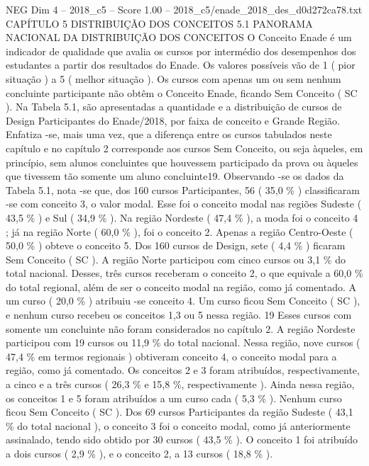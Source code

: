 \begin{textsample}{NEG Dim 4 – 2018\_c5 – Score 1.00 – 2018\_c5/enade\_2018\_des\_d0d272ca78.txt}  \label{ex:f4_neg_135}
CAPÍTULO 5 DISTRIBUIÇÃO DOS CONCEITOS 5.1 PANORAMA NACIONAL DA DISTRIBUIÇÃO DOS CONCEITOS O Conceito Enade é um indicador de qualidade que avalia os cursos por intermédio dos desempenhos dos estudantes a partir dos resultados do Enade.
Os valores possíveis vão de 1 ( pior situação ) a 5 ( melhor situação ).
Os cursos com apenas um ou sem nenhum concluinte participante não obtêm o Conceito Enade, ficando Sem Conceito ( SC ).
Na Tabela 5.1, são apresentadas a quantidade e a distribuição de cursos de Design Participantes do Enade/2018, por faixa de conceito e Grande Região.
Enfatiza -se, mais uma vez, que a diferença entre os cursos tabulados neste capítulo e no capítulo 2 corresponde aos cursos Sem Conceito, ou seja àqueles, em princípio, sem alunos concluintes que houvessem participado da prova ou àqueles que tivessem tão somente um aluno concluinte19.
Observando -se os dados da Tabela 5.1, nota -se que, dos 160 cursos Participantes, 56 ( 35,0 \% ) classificaram -se com conceito 3, o valor modal.
Esse foi o conceito modal nas regiões Sudeste ( 43,5 \% ) e Sul ( 34,9 \% ).
Na região Nordeste ( 47,4 \% ), a moda foi o conceito 4 ; já na região Norte ( 60,0 \% ), foi o conceito 2.
Apenas a região Centro-Oeste ( 50,0 \% ) obteve o conceito 5.
Dos 160 cursos de Design, sete ( 4,4 \% ) ficaram Sem Conceito ( SC ).
A região Norte participou com cinco cursos ou 3,1 \% do total nacional.
Desses, três cursos receberam o conceito 2, o que equivale a 60,0 \% do total regional, além de ser o conceito modal na região, como já comentado.
A um curso ( 20,0 \% ) atribuiu -se conceito 4.
Um curso ficou Sem Conceito ( SC ), e nenhum curso recebeu os conceitos 1,3 ou 5 nessa região. 19 Esses cursos com somente um concluinte não foram considerados no capítulo 2.
A região Nordeste participou com 19 cursos ou 11,9 \% do total nacional.
Nessa região, nove cursos ( 47,4 \% em termos regionais ) obtiveram conceito 4, o conceito modal para a região, como já comentado.
Os conceitos 2 e 3 foram atribuídos, respectivamente, a cinco e a três cursos ( 26,3 \% e 15,8 \%, respectivamente ).
Ainda nessa região, os conceitos 1 e 5 foram atribuídos a um curso cada ( 5,3 \% ).
Nenhum curso ficou Sem Conceito ( SC ).
Dos 69 cursos Participantes da região Sudeste ( 43,1 \% do total nacional ), o conceito 3 foi o conceito modal, como já anteriormente assinalado, tendo sido obtido por 30 cursos ( 43,5 \% ).
O conceito 1 foi atribuído a dois cursos ( 2,9 \% ), e o conceito 2, a 13 cursos ( 18,8 \% ).

\end{textsample}
